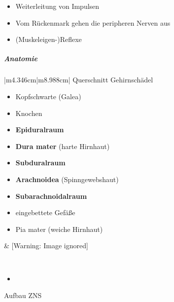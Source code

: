 \documentclass{article}
\newcommand\gEs[1]{\textbf{\textcolor[rgb]{0.0,0.0,0.5019608}{#1}}}
\newcommand\gEs[1]{\textbf{\textcolor[rgb]{0.0,0.0,0.5019608}{#1}}}
\newcommand\gT[1]{\textbf{\textup{\textcolor[rgb]{0.0,0.5019608,0.0}{#1}}}}
\begin{document}
\begin{itemize}
\item {\mdseries
Weiterleitung von Impulsen}

\item {\mdseries
Vom R\"uckenmark gehen die peripheren Nerven aus}

\item {\mdseries
(Muskeleigen-)Reflexe}

\end{itemize}
\subparagraph{Anatomie}
\begin{center}
\tablehead{}\begin{supertabular}{|m{4.346cm}|m{8.988cm}|}
\hline
{\mdseries\color{black} Querschnitt Gehirnsch\"adel}

\begin{itemize}
\item Kopfschwarte (Galea)

\item Knochen

\item {}\gEs{Epiduralraum}

\item {}\gT{Dura mater} (harte Hirnhaut)

\item {}\gEs{Subduralraum}

\item {}\gT{Arachnoidea}
(Spinngewebshaut)

\item
{}\gEs{Subarachnoidalraum}

\item eingebettete Gef\"a{\ss}e

\item Pia mater (weiche Hirnhaut)

\end{itemize}
 &
  [Warning: Image ignored] %
 

\\\hline
\end{supertabular}
\end{center}
\begin{itemize}
\item \end{itemize}
{\mdseries\color{black}
Aufbau ZNS}
\end{document}

